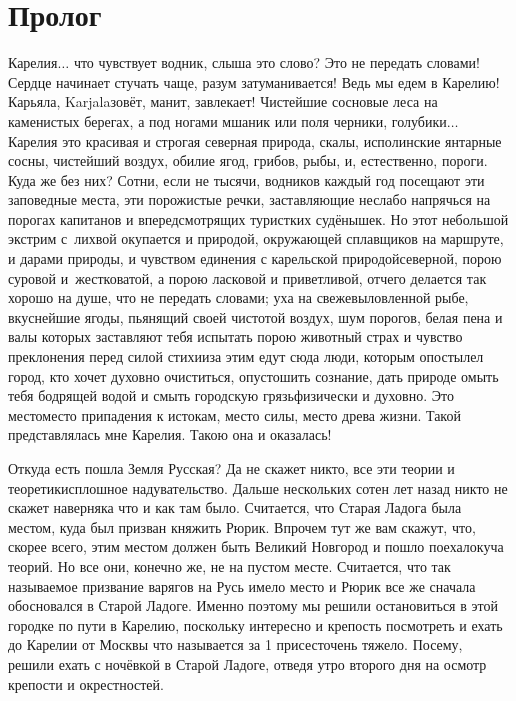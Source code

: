 {
\cleardoublepage
{}

\fancyhead[LE]{\fancyplain{}{}}
\fancyhead[RO]{\fancyplain{}{}}

\section*{Пролог}

Карелия$\ldots$ что чувствует водник, слыша это слово? Это не передать словами! Сердце начинает стучать чаще, разум затуманивается! Ведь мы едем в Карелию! Карьяла, Karjala\mdash зовёт, манит, завлекает! Чистейшие сосновые леса на каменистых берегах, а под ногами мшаник или поля черники, голубики$\ldots$ Карелия это красивая и строгая северная природа, скалы, исполинские янтарные сосны, чистейший воздух, обилие ягод, грибов, рыбы, и, естественно, пороги. Куда же без них? Сотни, если не тысячи, водников каждый год посещают эти заповедные места, эти порожистые речки, заставляющие неслабо напрячься на порогах капитанов и впередсмотрящих туристких судёнышек. Но этот небольшой экстрим с~лихвой окупается и природой, окружающей сплавщиков на маршруте, и дарами природы, и чувством единения с карельской природой\mdash северной, порою суровой и~жестковатой, а порою ласковой и приветливой, отчего делается так хорошо на душе, что не передать словами; уха на свежевыловленной рыбе, вкуснейшие ягоды, пьянящий своей чистотой воздух, шум порогов, белая пена и валы которых заставляют тебя испытать порою животный страх и чувство преклонения перед силой стихии\mdash за этим едут сюда люди, которым опостылел город, кто хочет духовно очиститься, опустошить сознание, дать природе омыть тебя бодрящей водой и смыть городскую грязь\mdash физически и духовно. Это место\mdash место припадения к истокам, место силы, место древа жизни. Такой представлялась мне Карелия. Такою она и оказалась!  

Откуда есть пошла Земля Русская? Да не скажет никто, все эти теории и теоретики\mdash сплошное надувательство. Дальше нескольких сотен лет назад никто не скажет наверняка что и как там было. Считается, что Старая Ладога была местом, куда был призван княжить Рюрик. Впрочем тут же вам скажут, что, скорее всего, этим местом должен быть Великий Новгород и пошло поехало\mdash куча теорий. Но все они, конечно же, не на пустом месте. Считается, что так называемое призвание варягов на Русь имело место и Рюрик все же сначала обосновался в Старой Ладоге. Именно поэтому мы решили остановиться в этой городке по пути в Карелию, поскольку интересно и крепость посмотреть и ехать до Карелии от Москвы что называется за 1 присест\mdash очень тяжело. Посему, решили ехать с ночёвкой в Старой Ладоге, отведя утро второго дня на осмотр крепости и окрестностей. 

}
